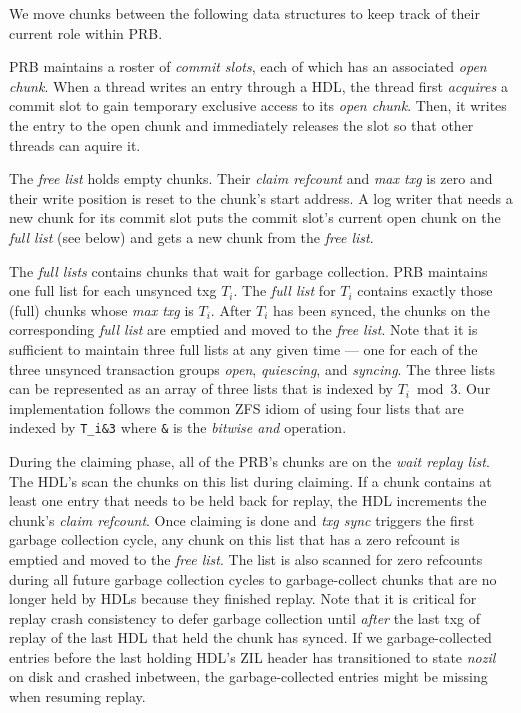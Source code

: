 \documentclass[12pt,a4paper,twoside]{book}
\begin{document}
We move chunks between the following data structures to keep track of their current role within PRB.
\begin{description}[noitemsep]
    \item[Commit Slots]
    PRB maintains a roster of \textit{commit slots}, each of which has an associated \textit{open chunk}.
    When a thread writes an entry through a HDL, the thread first \textit{acquires} a commit slot to gain temporary exclusive access to its \textit{open chunk}.
    Then, it writes the entry to the open chunk and immediately releases the slot so that other threads can aquire it.
    \item[Free List]
    The \textit{free list} holds empty chunks.
    Their \textit{claim refcount} and \textit{max txg} is zero and their write position is reset to the chunk's start address.
    A log writer that needs a new chunk for its commit slot puts the commit slot's current open chunk on the \textit{full list} (see below) and gets a new chunk from the \textit{free list}.
    \item[Full Lists]
    The \textit{full lists} contains chunks that wait for garbage collection.
    PRB maintains one full list for each unsynced txg $T_i$. The \textit{full list} for $T_i$ contains exactly those (full) chunks whose \textit{max txg} is $T_i$.
    After $T_i$ has been synced, the chunks on the corresponding \textit{full list} are emptied and moved to the \textit{free list}.
    Note that it is sufficient to maintain three full lists at any given time --- one for each of the three unsynced transaction groups \textit{open}, \textit{quiescing}, and \textit{syncing}.
    The three lists can be represented as an array of three lists that is indexed by $T_i \bmod 3$.
    Our implementation follows the common ZFS idiom of using four lists that are indexed by \lstinline{T_i&3} where \lstinline{&} is the \textit{bitwise and} operation.
    \item[Wait Replay List]
    During the claiming phase, all of the PRB's chunks are on the \textit{wait replay list}.
    The HDL's scan the chunks on this list during claiming.
    If a chunk contains at least one entry that needs to be held back for replay, the HDL increments the chunk's \textit{claim refcount}.
    Once claiming is done and \textit{txg sync} triggers the first garbage collection cycle, any chunk on this list that has a zero refcount is emptied and moved to the \textit{free list}.
    The list is also scanned for zero refcounts during all future garbage collection cycles to garbage-collect chunks that are no longer held by HDLs because they finished replay.
    Note that it is critical for replay crash consistency to defer garbage collection until \textit{after} the last txg of replay of the last HDL that held the chunk has synced.
    If we garbage-collected entries before the last holding HDL's ZIL header has transitioned to state \textit{nozil} on disk and crashed inbetween, the garbage-collected entries might be missing when resuming replay.
\end{description}
\end{document}
